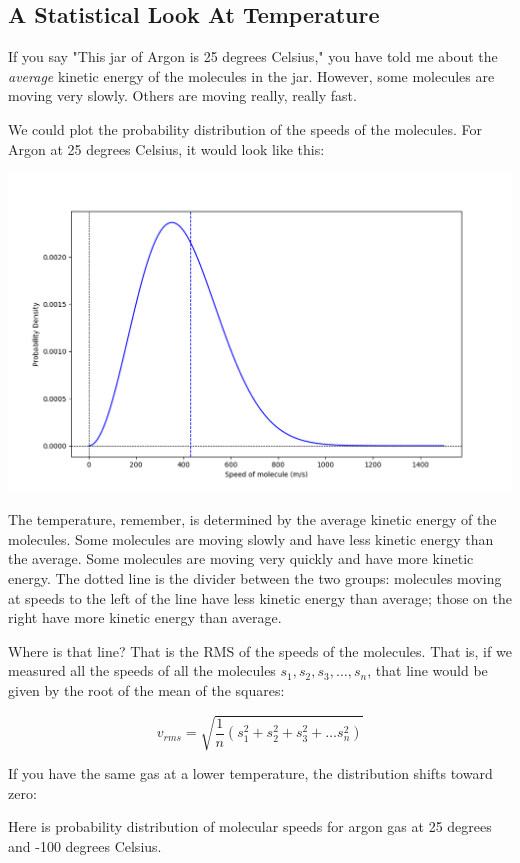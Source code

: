 \subsection{A Statistical Look At Temperature}

If you say "This jar of Argon is 25 degrees Celsius,"  you have told me about the \emph{average} kinetic energy of the molecules in the jar.  
However,  some molecules are moving very slowly.  Others are moving really,  really fast. 

We could plot the probability distribution of the speeds of the molecules.  For Argon at 25 degrees Celsius, it would look like this:

\includegraphics[width=\textwidth]{ar_plot.png}

The temperature,  remember,  is determined by the average kinetic energy of the molecules.  Some molecules are moving slowly and have less kinetic energy than the average.  Some molecules are moving very quickly and have more kinetic energy.  The dotted line is the divider between the two groups: molecules moving at speeds to the left of the line have less kinetic energy than average; those on the right have more kinetic energy than average.

Where is that line?  That is the RMS of the speeds of the molecules.  That is, if we measured all the speeds of all the molecules  $s_1, s_2, s_3, \ldots, s_n$, that line would be given by the root of the mean of the squares:

$$v_{rms} = \sqrt{\frac{1}{n} \left( s_1^2 + s_2^2 + s_3^2 + \ldots s_n^2 \right)}$$

If you have the same gas at a lower temperature, the distribution shifts toward zero:

Here is probability distribution of molecular speeds for argon gas at 25 degrees and -100 degrees Celsius.

